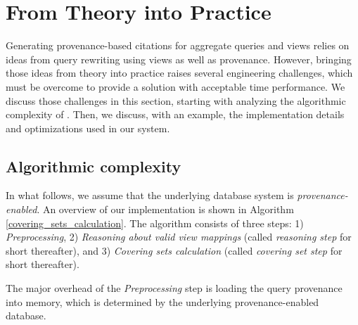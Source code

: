 \section{From Theory into Practice}\label{Sec: implementation}
Generating provenance-based citations for aggregate queries and views relies on ideas from query rewriting using views as well as provenance. However, bringing those ideas from theory into practice raises several engineering challenges, which must be overcome to provide a solution with acceptable time performance. We discuss those challenges in this section, starting with analyzing the algorithmic complexity of \provalg {}. Then, we discuss, with an example, the implementation details and optimizations used in our system.


\subsection{Algorithmic complexity}
In what follows, we assume that the underlying database system is \textit{provenance-enabled}. An overview of our implementation is shown in Algorithm \ref{covering_sets_calculation}.  The algorithm consists of three steps: 1) {\em Preprocessing}, 2) {\em Reasoning about valid view mappings} (called {\em reasoning step} for short thereafter), and 3) {\em Covering sets calculation} (called {\em covering set step} for short thereafter). 

The major overhead of the {\em Preprocessing} step is loading the query provenance into memory, which is determined by the underlying provenance-enabled database. 

